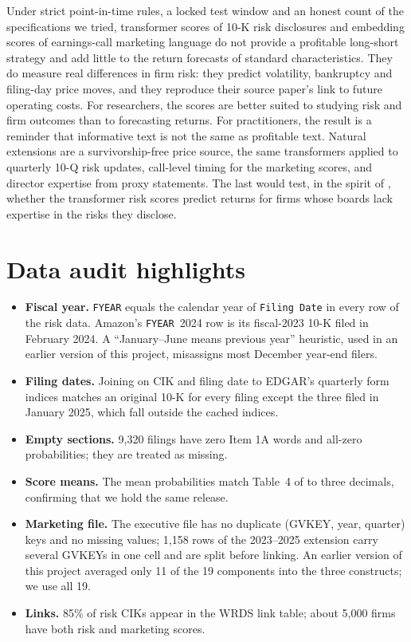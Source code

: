 \documentclass[11pt,a4paper]{article}
\begin{document}
Under strict point-in-time rules, a locked test window and an honest count of the specifications we tried, transformer
scores of 10-K risk disclosures and embedding scores of earnings-call marketing language do not provide a profitable
long-short strategy and add little to the return forecasts of standard characteristics. They do measure real differences
in firm risk: they predict volatility, bankruptcy and filing-day price moves, and they reproduce their source paper's
link to future operating costs. For researchers, the scores are better suited to studying risk and firm outcomes than to
forecasting returns. For practitioners, the result is a reminder that informative text is not the same as profitable text.
Natural extensions are a survivorship-free price source, the same transformers applied to quarterly 10-Q risk updates,
call-level timing for the marketing scores, and director expertise from proxy statements. The last would test, in the
spirit of \citet{schnatterly2021}, whether the transformer risk scores predict returns for firms whose boards lack
expertise in the risks they disclose.




\appendix

\section{Data audit highlights}\label{app:audit}

\begin{itemize}
  \item \textbf{Fiscal year.} \texttt{FYEAR} equals the calendar year of \texttt{Filing Date} in every row of the risk data.
  Amazon's \texttt{FYEAR}~2024 row is its fiscal-2023 10-K filed in February 2024. A ``January--June means previous year''
  heuristic, used in an earlier version of this project, misassigns most December year-end filers.
  \item \textbf{Filing dates.} Joining on CIK and filing date to EDGAR's quarterly form indices matches an original 10-K for
  every filing except the three filed in January 2025, which fall outside the cached indices.
  \item \textbf{Empty sections.} 9,320 filings have zero Item 1A words and all-zero probabilities; they are treated as missing.
  \item \textbf{Score means.} The mean probabilities match Table~4 of \citet{astvansh2026} to three decimals, confirming that we
  hold the same release.
  \item \textbf{Marketing file.} The executive file has no duplicate (GVKEY, year, quarter) keys and no missing values; 1,158
  rows of the 2023--2025 extension carry several GVKEYs in one cell and are split before linking. An earlier version of this
  project averaged only 11 of the 19 components into the three constructs; we use all 19.
  \item \textbf{Links.} 85\% of risk CIKs appear in the WRDS link table; about 5,000 firms have both risk and marketing scores.
\end{itemize}
\end{document}
